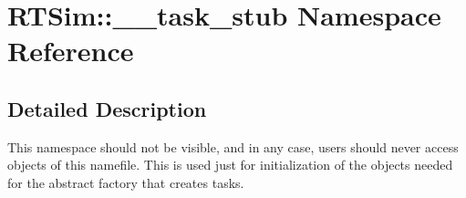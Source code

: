 \hypertarget{namespaceRTSim_1_1____task__stub}{}\section{R\+T\+Sim\+:\+:\+\_\+\+\_\+task\+\_\+stub Namespace Reference}
\label{namespaceRTSim_1_1____task__stub}


\subsection{Detailed Description}
This namespace should not be visible, and in any case, users should never access objects of this namefile. This is used just for initialization of the objects needed for the abstract factory that creates tasks. 